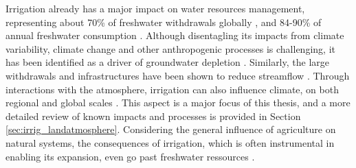 Irrigation already has a major impact on water resources management, representing about 70\% of freshwater withdrawals globally , and 84-90\% of annual freshwater consumption \citep[``withdrawn water that is evaporated, transpired, incorporated into products or crops, or consumed by humans or livestock", ][]{ mcdermid_irrigation_2023, qin_flexibility_2019}.
Although disentagling its impacts from climate variability, climate change and other anthropogenic processes is challenging, it has been identified as a driver of groundwater depletion \citep{siebert_groundwater_2010,smith_estimating_2017, thomas_identifying_2019}. 
Similarly, the large withdrawals and infrastructures have been shown to reduce streamflow \citep{biemans_impact_2011, pokhrel_recent_2016, vicente-serrano_climate_2019}. 
Through interactions with the atmosphere, irrigation can also influence climate, on both regional \citep{nocco_observation_2019} and global scales \citep{puma_effects_2010, cook_irrigation_2015,arboleda-obando_feedback_2023, arboleda-obando_joint_2025}. This aspect is a major focus of this thesis, and a more detailed review of known impacts and processes is provided in Section \ref{sec:irrig_landatmosphere}.
Considering the general influence of agriculture on natural systems, the consequences of irrigation, which is often instrumental in enabling its expansion, even go past freshwater ressources \citep{campbell2017agriculture}.


